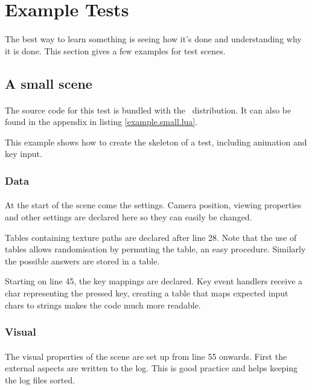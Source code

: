 \section{Example Tests}
\paragraph{}
The best way to learn something is seeing how it's done and understanding why it is done.
This section gives a few examples for test scenes.

\subsection{A small scene}
\paragraph{}
The source code for this test is bundled with the \ER\ distribution.
It can also be found in the appendix in listing \ref{example.small.lua}.

This example shows how to create the skeleton of a test, including animation and key input.

\subsubsection{Data}
\paragraph{}
At the start of the scene come the settings.
Camera position, viewing properties and other settings are declared here so they can easily be changed.

Tables containing texture paths are declared after line 28.
Note that the use of tables allows randomisation by permuting the table, an easy procedure.
Similarly the possible answers are stored in a table.

Starting on line 45, the key mappings are declared.
Key event handlers receive a char representing the pressed key, creating a table that maps expected input chars to strings makes the code much more readable.

\subsubsection{Visual}
\paragraph{}
The visual properties of the scene are set up from line 55 onwards.
First the external aspects are written to the log.
This is good practice and helps keeping the log files sorted.

